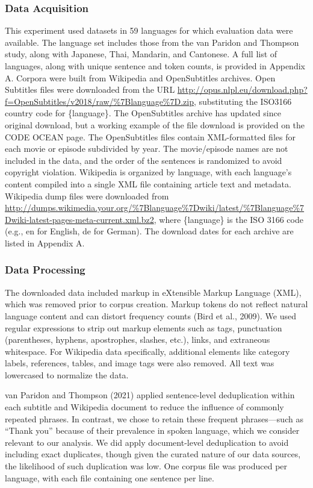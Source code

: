 \documentclass[
  man]{apa6}
\begin{document}
\subsubsection{Data Acquisition}\label{data-acquisition}

This experiment used datasets in 59 languages for which evaluation data were available. The language set includes those from the van Paridon and Thompson study, along with Japanese, Thai, Mandarin, and Cantonese. A full list of languages, along with unique sentence and token counts, is provided in Appendix A. Corpora were built from Wikipedia and OpenSubtitles archives. Open Subtitles files were downloaded from the URL \url{http://opus.nlpl.eu/download.php?f=OpenSubtitles/v2018/raw/\%7Blanguage\%7D.zip}, substituting the ISO3166 country code for \{language\}. The OpenSubtitles archive has updated since original download, but a working example of the file download is provided on the CODE OCEAN page. The OpenSubtitles files contain XML-formatted files for each movie or episode subdivided by year. The movie/episode names are not included in the data, and the order of the sentences is randomized to avoid copyright violation. Wikipedia is organized by language, with each language's content compiled into a single XML file containing article text and metadata. Wikipedia dump files were downloaded from \url{http://dumps.wikimedia.your.org/\%7Blanguage\%7Dwiki/latest/\%7Blanguage\%7Dwiki-latest-pages-meta-current.xml.bz2}, where \{language\} is the ISO 3166 code (e.g., en for English, de for German). The download dates for each archive are listed in Appendix A.

\subsubsection{Data Processing}\label{data-processing}

The downloaded data included markup in eXtensible Markup Language (XML), which was removed prior to corpus creation. Markup tokens do not reflect natural language content and can distort frequency counts (Bird et al., 2009). We used regular expressions to strip out markup elements such as tags, punctuation (parentheses, hyphens, apostrophes, slashes, etc.), links, and extraneous whitespace. For Wikipedia data specifically, additional elements like category labels, references, tables, and image tags were also removed. All text was lowercased to normalize the data.

van Paridon and Thompson (2021) applied sentence-level deduplication within each subtitle and Wikipedia document to reduce the influence of commonly repeated phrases. In contrast, we chose to retain these frequent phrases---such as ``Thank you'' because of their prevalence in spoken language, which we consider relevant to our analysis. We did apply document-level deduplication to avoid including exact duplicates, though given the curated nature of our data sources, the likelihood of such duplication was low. One corpus file was produced per language, with each file containing one sentence per line.
\end{document}
